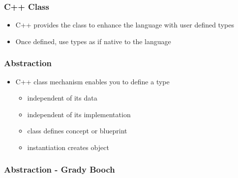 \begin{Shaded}
\begin{Highlighting}[]

\NormalTok{\};}

\NormalTok{\{}
  \NormalTok{<}
\NormalTok{\}}
\end{Highlighting}
\end{Shaded}

\hypertarget{c-class}{%
\subsubsection{C++ Class}\label{c-class}}

\begin{itemize}
\tightlist
\item
  C++ provides the class to enhance the language with user defined types
\item
  Once defined, use types as if native to the language
\end{itemize}

\hypertarget{abstraction}{%
\subsubsection{Abstraction}\label{abstraction}}

\begin{itemize}
\tightlist
\item
  C++ class mechanism enables you to define a type

  \begin{itemize}
  \tightlist
  \item
    independent of its data
  \item
    independent of its implementation
  \item
    class defines concept or blueprint
  \item
    instantiation creates object
  \end{itemize}
\end{itemize}

\hypertarget{abstraction---grady-booch}{%
\subsubsection{Abstraction - Grady
Booch}\label{abstraction---grady-booch}}

